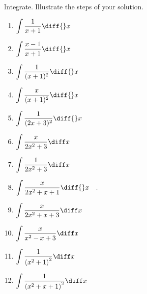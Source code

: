 Integrate. Illustrate the steps of your solution. %
\begin{multicols}{2}
\begin{enumerate}[ref={\fcProblemRef}]
\item $\displaystyle \int \frac{1}{x+1}\diff {}x$

\item $\displaystyle \int \frac{x-1}{x+1}\diff {}x$

\item $\displaystyle \int \frac{ 1}{(x+1)^2}\diff {}x$

\item $\displaystyle \int \frac{x}{(x+1)^2}\diff {}x$

\item $\displaystyle \int \frac{ 1}{ (2x+3)^2}\diff {}x$

\item $\displaystyle
\int \frac{x}{ 2x^2+3}\diff x
$

\item $\displaystyle
\int \frac{1}{ 2x^2+3}\diff x
$

\item \label{problemIntegrate x/(2x^2+x+1) dx}
$\displaystyle\int \frac{x }{2x^2+x+1}\diff{}x\quad .
$

\item $\displaystyle
\int \frac{x}{ 2x^2+x+3}\diff x
$

\item $\displaystyle
\int \frac{x}{ x^2-x+3}\diff x
$

\item \label{problemint1/(x^2+1)^2dx}  $\displaystyle
\int \frac{1}{ \left(x^2+1\right)^2}\diff x
$

\item \label{problemint1/(x^2+x+1)^2dx} $\displaystyle
\int \frac{1}{ \left(x^2+x +1 \right)^2 } \diff x
$


\end{enumerate}
\end{multicols}
